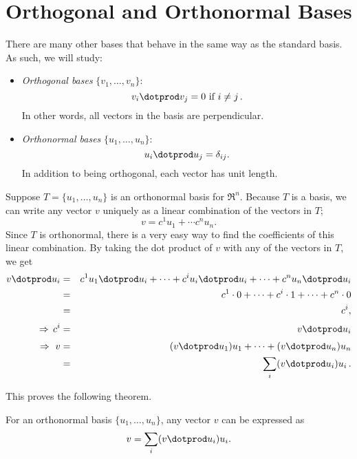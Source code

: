\section{Orthogonal and Orthonormal Bases}

There are many other bases that  behave in the same way as the standard basis.  As such, we will study:
\begin{itemize}
\item \emph{Orthogonal bases} $\{v_1, \ldots, v_n \}$:
\[
v_i\dotprod v_j=0 \text{ if } i\neq j\, .
\]
In other words, all vectors in the basis are perpendicular.

\item \emph{Orthonormal bases} $\{u_1, \ldots, u_n \}$:
\[
u_i\dotprod u_j = \delta_{ij}.
\]
In addition to being orthogonal, each vector has unit length.
\end{itemize}

Suppose $T=\{u_1, \ldots, u_n \}$ is an orthonormal basis for $\Re^n$.  Because $T$ is a basis, we can write any vector $v$ uniquely as a linear combination of the vectors in $T$;
\[
v=c^1u_1+\cdots c^nu_n.
\]
Since $T$ is orthonormal, there is a very easy way to find the coefficients of this linear combination.  By taking the dot product of $v$ with any of the vectors in $T$, we get
\begin{eqnarray*}
v\dotprod u_i &=& c^1u_1\dotprod u_i + \cdots + c^iu_i\dotprod u_i + \cdots + c^nu_n\dotprod u_i \\
& = & c^1\cdot 0 + \cdots + c^i\cdot 1 + \cdots + c^n\cdot 0 \\
& = & c^i, \\[1mm]
\Rightarrow\, c^i &=& v\dotprod u_i \\[1mm]
\Rightarrow\  v &=& (v\dotprod u_1) u_1 + \cdots + (v\dotprod u_n)u_n\\
&=& \sum_i (v\dotprod u_i)u_i\, .
\end{eqnarray*}

This proves the following theorem.
\begin{theorem}
For an orthonormal basis $\{u_1, \ldots, u_n \}$, any vector $v$ can be expressed as
\[
v =\sum_i (v\dotprod u_i)u_i.
\]
\end{theorem}


